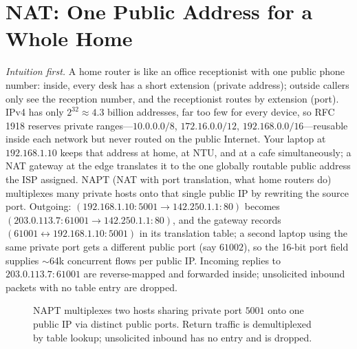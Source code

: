 \section{NAT: One Public Address for a Whole Home}\label{sec:nat}
\emph{Intuition first.} A home router is like an office receptionist with one public phone number: inside, every desk has a short extension (private address); outside callers only see the reception number, and the receptionist routes by extension (port). IPv4 has only $2^{32}\approx4.3$ billion addresses, far too few for every device, so RFC\,1918 reserves private ranges---$10.0.0.0/8$, $172.16.0.0/12$, $192.168.0.0/16$---reusable inside each network but never routed on the public Internet. Your laptop at $192.168.1.10$ keeps that address at home, at NTU, and at a cafe simultaneously; a NAT gateway at the edge translates it to the one globally routable public address the ISP assigned.
NAPT (NAT with port translation, what home routers do) multiplexes many private hosts onto that single public IP by rewriting the source port. Outgoing: $(192.168.1.10{:}5001 \to 142.250.1.1{:}80)$ becomes $(203.0.113.7{:}61001 \to 142.250.1.1{:}80)$, and the gateway records $(61001 \leftrightarrow 192.168.1.10{:}5001)$ in its translation table; a second laptop using the same private port gets a different public port (say $61002$), so the 16-bit port field supplies $\sim$64k concurrent flows per public IP. Incoming replies to $203.0.113.7{:}61001$ are reverse-mapped and forwarded inside; unsolicited inbound packets with no table entry are dropped.
\begin{figure}[h]
\centering
{}%
\caption{NAPT multiplexes two hosts sharing private port $5001$ onto one public IP via distinct public ports. Return traffic is demultiplexed by table lookup; unsolicited inbound has no entry and is dropped.}
\label{fig:nat}
\end{figure}
